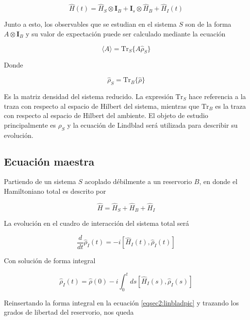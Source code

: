 \begin{equation*}
    \hat{H}(t) = \hat{H}_{S} \otimes \mathbf{I}_{B} + \mathbf{I}_{s} \otimes \hat{H}_{B} + \hat{H}_{I}(t)
\end{equation*}

Junto a esto,  los observables que se estudian en el sistema $S$ son de la forma $A\otimes \mathbf{I}_{B}$ y su valor de expectación puede ser calculado mediante la ecuación

\begin{equation*}
    \langle A \rangle = \text{Tr}_{S}\{A \hat{\rho}_{S} \}
\end{equation*}

Donde 

\begin{equation*}
    \hat{\rho}_{S} = \text{Tr}_{B}\{ \hat{\rho} \}
\end{equation*}

Es la matriz densidad del sistema reducido. La expresión $\text{Tr}_{S}$ hace referencia a la traza con respecto al espacio de Hilbert del sistema, mientras que $\text{Tr}_{B}$  
es la traza con respecto al espacio de Hilbert del ambiente. El objeto de estudio principalmente es $\rho_{S}$ y la ecuación de Lindblad será utilizada para describir su evolución.

\subsection{Ecuación maestra}
Partiendo de un sistema $S$ acoplado débilmente a un reservorio $B$, en donde el Hamiltoniano total es descrito por 

\begin{equation*}
    \hat{H} = \hat{H}_{S} + \hat{H}_{B} + \hat{H}_{I}
\end{equation*}

La evolución en el cuadro de interacción del sistema total será

\begin{equation}
    \frac{d}{dt}\hat{\rho}_{I}(t) = -i[\hat{H}_{I}(t), \hat{\rho}_{I}(t)]
    \label{eqsec2:linbladpic}
\end{equation}

Con solución de forma integral

\begin{equation*}
    \hat{\rho}_{I}(t) = \hat{\rho}(0) - i \int_{0}^{t} ds[\hat{H}_{I}(s), \hat{\rho}_{I}(s)]
\end{equation*}

Reinsertando la forma integral en la ecuación \ref{eqsec2:linbladpic} y trazando los grados de libertad del reservorio, nos queda

